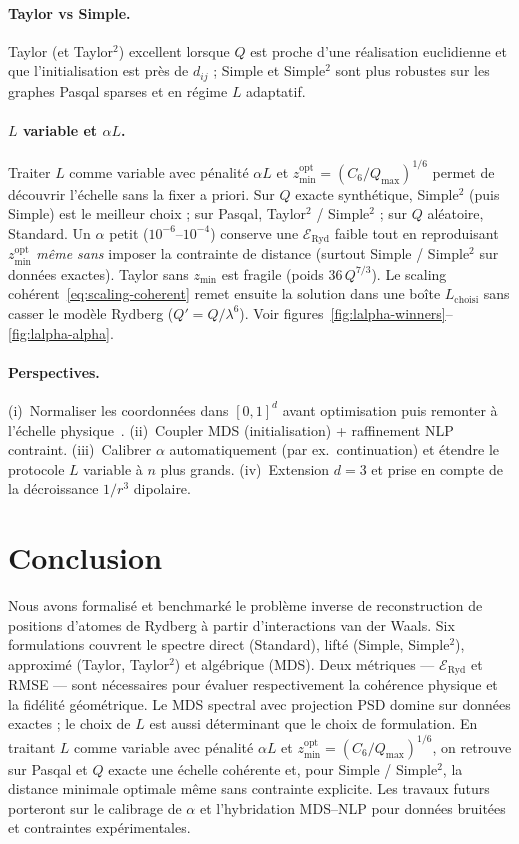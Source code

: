 \documentclass[11pt,a4paper]{article}
\theoremstyle{definition}
\theoremstyle{remark}
\newcommand{\Eryd}{\mathcal{E}_{\mathrm{Ryd}}}
\newcommand{\cSix}{C_6}
\begin{document}
\paragraph{Taylor vs Simple.}
Taylor (et Taylor$^2$) excellent lorsque $Q$ est proche d'une réalisation
euclidienne et que l'initialisation est près de $d_{ij}$ ; Simple et
Simple$^2$ sont plus robustes sur les graphes Pasqal sparses et en régime
$L$ adaptatif.

\paragraph{$L$ variable et $\alpha L$.}
Traiter $L$ comme variable avec pénalité $\alpha L$ et
$z_{\min}^{\mathrm{opt}}=(\cSix/Q_{\max})^{1/6}$ permet de découvrir
l'échelle sans la fixer a priori.
Sur $Q$ exacte synthétique, Simple$^2$ (puis Simple) est le meilleur
choix ; sur Pasqal, Taylor$^2$ / Simple$^2$ ; sur $Q$ aléatoire, Standard.
Un $\alpha$ petit ($10^{-6}$--$10^{-4}$) conserve une $\Eryd$ faible tout
en reproduisant $z_{\min}^{\mathrm{opt}}$ \emph{même sans} imposer la
contrainte de distance (surtout Simple / Simple$^2$ sur données exactes).
Taylor sans $z_{\min}$ est fragile (poids $36\,Q^{7/3}$).
Le scaling cohérent~\eqref{eq:scaling-coherent} remet ensuite
la solution dans une boîte $L_{\mathrm{choisi}}$ sans casser le modèle
Rydberg ($Q'=Q/\lambda^6$).
Voir figures~\ref{fig:lalpha-winners}--\ref{fig:lalpha-alpha}.

\paragraph{Perspectives.}
(i)~Normaliser les coordonnées dans $[0,1]^d$ avant optimisation puis
remonter à l'échelle physique~\cite{henry2024}.
(ii)~Coupler MDS (initialisation) + raffinement NLP contraint.
(iii)~Calibrer $\alpha$ automatiquement (par ex.\ continuation) et étendre
le protocole $L$ variable à $n$ plus grands.
(iv)~Extension $d=3$ et prise en compte de la décroissance $1/r^3$ dipolaire.

\section{Conclusion}
\label{sec:conclusion}

Nous avons formalisé et benchmarké le problème inverse de reconstruction
de positions d'atomes de Rydberg à partir d'interactions van der Waals.
Six formulations couvrent le spectre direct (Standard), lifté (Simple,
Simple$^2$), approximé (Taylor, Taylor$^2$) et algébrique (MDS). Deux métriques
--- $\Eryd$ et RMSE --- sont nécessaires pour
évaluer respectivement la cohérence physique et la fidélité géométrique.
Le MDS spectral avec projection PSD domine sur données exactes ; le choix
de $L$ est aussi déterminant que le choix de formulation. En traitant $L$
comme variable avec pénalité $\alpha L$ et
$z_{\min}^{\mathrm{opt}}=(\cSix/Q_{\max})^{1/6}$, on retrouve sur Pasqal
et $Q$ exacte une échelle cohérente et, pour Simple / Simple$^2$, la
distance minimale optimale même sans contrainte explicite. Les travaux futurs
porteront sur le calibrage de $\alpha$ et l'hybridation MDS--NLP pour
données bruitées et contraintes expérimentales.
\end{document}
